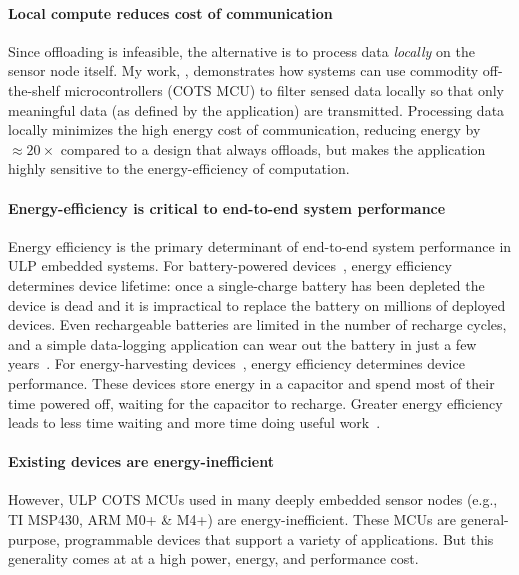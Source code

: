 \paragraph{Local compute reduces cost of communication}
Since offloading is infeasible,
the alternative is to process data \emph{locally} on the sensor node itself.
% 
My work, \sonic, demonstrates how systems can use commodity off-the-shelf microcontrollers (COTS MCU) to filter sensed data locally so that only meaningful data (as defined by the application) are transmitted.
% 
Processing data locally minimizes the high energy cost of communication, reducing energy by $\approx20\times$ compared to a design that always offloads, but makes the application highly sensitive to the energy-efficiency of computation.

\paragraph{Energy-efficiency is critical to end-to-end system performance}
Energy efficiency is the primary determinant of end-to-end system performance in ULP embedded systems.
% 
For battery-powered devices~\cite{culler2002mica,rowe2011sensor}, energy efficiency determines device lifetime: once a single-charge battery has been depleted the device is dead and it is impractical to replace the battery on millions of deployed devices.
% 
Even rechargeable batteries are limited in the number of recharge cycles, and a simple data-logging application can wear out the battery in just a few years~\cite{jackson_2019,nardello2019camaroptera}.
% 
For energy-harvesting devices~\cite{colin2018reconfigurable,hester2015tragedy,flicker,moo,windware}, energy efficiency determines device performance.
% 
These devices store energy in a capacitor and spend most of their time powered off, waiting for the capacitor to recharge.
% 
Greater energy efficiency leads to less time waiting and more time doing useful work~\cite{desai2020power}.

\paragraph{Existing devices are energy-inefficient}
However, ULP COTS MCUs used in many deeply embedded sensor nodes
(e.g., TI MSP430, ARM M0+ \& M4+) are energy-inefficient.
%
These MCUs are general-purpose, programmable devices that support a variety of
applications.
% 
But this generality comes at at a high power, energy, and performance cost.

